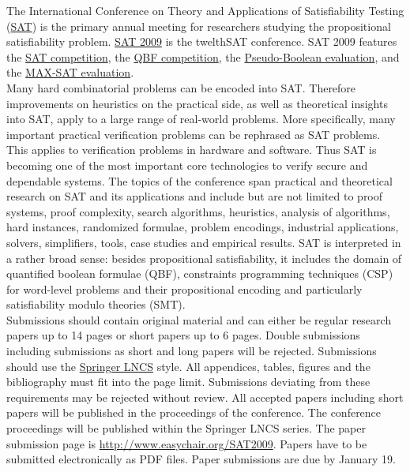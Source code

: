 \documentclass[10pt]{article}
\begin{document}
\begin{minipage}[t]{9.25cm}
  \begin{minipage}[t]{9.25cm}
    \vspace*{0.15cm}
  {\small
  The International Conference on Theory and Applications of
  Satisfiability Testing (\href{http://www.satisfiability.org}{SAT})
  is the primary annual meeting for researchers studying the
  propositional satisfiability
  problem. \href{http://cs-svr1.swan.ac.uk/~csoliver/SAT2009}{SAT
    2009} is the twelthSAT conference. SAT 2009 features the
  \href{http://www.satcompetition.org/2009}{SAT competition}, the
  \href{http://www.qbflib.org/qbfeval}{QBF competition}, the
  \href{http://www.cril.univ-artois.fr/PB09}{Pseudo-Boolean evaluation}, and the
  \href{http://www.maxsat07.udl.es}{MAX-SAT evaluation}. \\[0.1cm]
%
  Many hard combinatorial problems can be encoded into
  SAT. Therefore improvements on heuristics on the practical side, as
  well as theoretical insights into SAT, apply to a large range of
  real-world problems. More specifically, many important practical
  verification problems can be rephrased as SAT problems. This
  applies to verification problems in hardware and software. Thus SAT
  is becoming one of the most important core technologies to verify
  secure and dependable systems. The topics of the conference span
  practical and theoretical research on SAT and its applications and
  include but are not limited to proof systems, proof complexity,
  search algorithms, heuristics, analysis of algorithms, hard
  instances, randomized formulae, problem encodings, industrial
  applications, solvers, simplifiers, tools, case studies and
  empirical results. SAT is interpreted in a rather broad sense:
  besides propositional satisfiability, it includes the domain
  of quantified boolean formulae (QBF), constraints programming
  techniques (CSP) for word-level problems and their propositional
  encoding and particularly satisfiability modulo theories (SMT). \\[0.1cm]
%
  Submissions should contain original material and can either be
  regular research papers up to 14 pages or short papers up to 6
  pages. Double submissions including submissions as short and long
  papers will be rejected.  Submissions should use the 
  \href{http://www.springer.com/comp/lncs/Authors.html}{Springer LNCS}
  style. All appendices, tables, figures and the bibliography 
  must fit into the page limit. Submissions deviating from these
  requirements may be rejected without review. All accepted papers
  including short papers will be published in the proceedings of the
  conference. The conference proceedings will be published within
  the Springer LNCS series. The paper submission page is
  \url{http://www.easychair.org/SAT2009}. Papers have to be submitted
  electronically as PDF files.  Paper submissions are due by January
  19.
  }
  \end{minipage}


\end{minipage}
\end{document}
